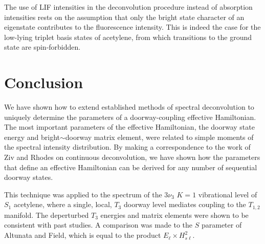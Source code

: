 The use of LIF intensities in the deconvolution procedure instead of
absorption intensities rests on the assumption that only the bright
state character of an eigenstate contributes to the fluorescence
intensity.  This is indeed the case for the low-lying triplet basis
states of acetylene, from which transitions to the ground state are
spin-forbidden.  

\section{Conclusion}

We have shown how to extend established methods of spectral
deconvolution to uniquely determine the parameters of a
doorway-coupling effective Hamiltonian.  The most important parameters
of the effective Hamiltonian, the doorway state energy and
bright$\sim$doorway matrix element, were related to simple moments of
the spectral intensity distribution.  By making a correspondence to
the work of Ziv and Rhodes on continuous deconvolution, we have shown
how the parameters that define an effective Hamiltonian can be derived
for any number of sequential doorway states.

This technique was applied to the spectrum of the $3\nu_3$ $K=1$
vibrational level of $S_1$ acetylene, where a single, local, $T_3$
doorway level mediates coupling to the $T_{1,2}$ manifold.  The
deperturbed $T_3$ energies and matrix elements were shown to be
consistent with past studies.  A comparison was made to the $S$
parameter of Altunata and Field, which is equal to the product
$E_{\ell} \times H_{s\ell}^2$.



%
% 
% 
% 
